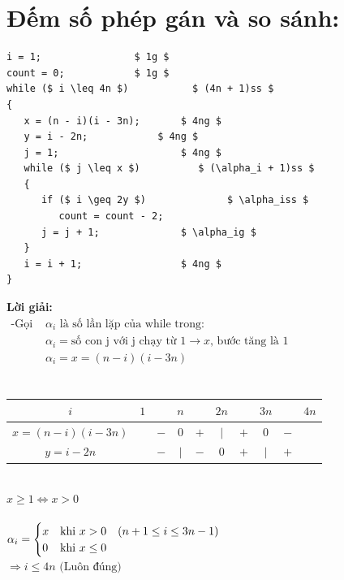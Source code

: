 \documentclass[12pt, letterpaper]{article}
\begin{document}
\section{Đếm số phép gán và so sánh:}
\begin{lstlisting}
i = 1;			      $ 1g $
count = 0;		      $ 1g $
while ($ i \leq 4n $)		    $ (4n + 1)ss $
{
   x = (n - i)(i - 3n);       $ 4ng $
   y = i - 2n;		      $ 4ng $
   j = 1;                     $ 4ng $
   while ($ j \leq x $)		     $ (\alpha_i + 1)ss $
   {
      if ($ i \geq 2y $)      	      $ \alpha_iss $
         count = count - 2;
      j = j + 1;              $ \alpha_ig $
   }
   i = i + 1;        	      $ 4ng $
}
	\end{lstlisting}
	\textbf{Lời giải:} \\
	$ \begin{aligned}
		\text{-Gọi } & \alpha_i \text{ là số lần lặp của while trong:}                              \\
					& \alpha_i = \text{số con j với j chạy từ 1} \rightarrow x \text{, bước tăng là 1} \\
					& \alpha_i = x = (n-i)(i-3n) \\
	\end{aligned} $ \\
	 \\
	\begin{table}[htb]
		\begin{tabular}{c|c c c c c c c c c}
			$i$ & $1$ &  & $n$ &  & $2n$ &  & $3n$  & & $4n$\\
			\hline
			$x = (n-i)(i-3n)$ &  & $-$ & $0$ & $+$ & $\vert$ & $+$ & $0$ & $-$\\
			\hline
			$y = i - 2n$ &  & $-$ & $\vert$ & $-$ & $0$ & $+$ & $\vert$ & $+$\\
		\end{tabular}
	\end{table} \\
	 $x \geq 1 \Leftrightarrow x > 0$ \\ \\
	$\alpha_i =
	\begin{cases}
	x &\text{khi } x>0 \quad (n + 1 \leq i \leq 3n - 1)\\
	0 &\text{khi } x\leq 0
	\end{cases} \\$
	 \\
	$\Rightarrow i \leq 4n \text{ (Luôn đúng)}$\\
\end{document}
